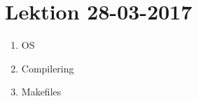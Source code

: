 \section{Lektion 28-03-2017}

\begin{enumerate}
	\item OS
	\item Compilering
	\item Makefiles		
\end{enumerate}
